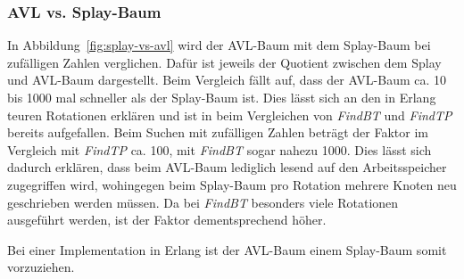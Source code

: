 \subsubsection{AVL vs. Splay-Baum}
In Abbildung~\ref{fig:splay-vs-avl} wird der AVL-Baum mit dem Splay-Baum bei zufälligen Zahlen
verglichen.
Dafür ist jeweils der Quotient zwischen dem Splay und AVL-Baum dargestellt.
Beim Vergleich fällt auf, dass der AVL-Baum ca. 10 bis 1000 mal schneller als der Splay-Baum ist.
Dies lässt sich an den in Erlang teuren Rotationen erklären und ist in beim Vergleichen von
\textit{FindBT} und \textit{FindTP} bereits aufgefallen.
Beim Suchen mit zufälligen Zahlen beträgt der Faktor im Vergleich mit \textit{FindTP} ca. 100, mit
\textit{FindBT} sogar nahezu 1000.
Dies lässt sich dadurch erklären, dass beim AVL-Baum lediglich lesend auf den
Arbeitsspeicher zugegriffen wird, wohingegen beim Splay-Baum pro Rotation mehrere Knoten neu
geschrieben werden müssen.
Da bei \textit{FindBT} besonders viele Rotationen ausgeführt werden, ist der Faktor dementsprechend
höher.

Bei einer Implementation in Erlang ist der AVL-Baum einem
Splay-Baum somit vorzuziehen.
